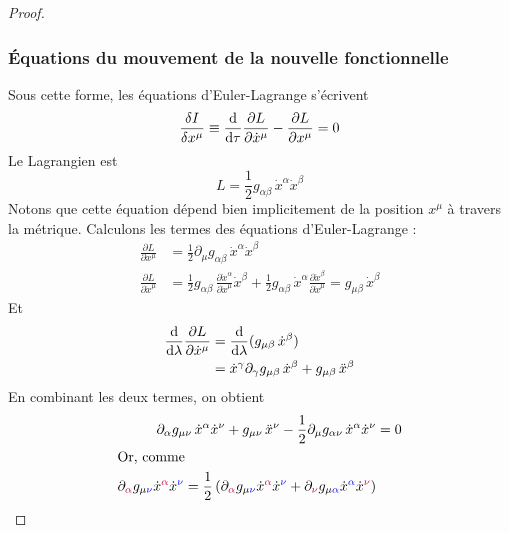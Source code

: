 \begin{proof}
    \subsubsection{Équations du mouvement de la nouvelle fonctionnelle}
    Sous cette forme, les équations d'Euler-Lagrange s'écrivent
    \begin{equation}
        \frac{\delta I}{\delta x^{\mu}} \equiv \frac{\mathrm{d} }{\mathrm{d} \tau}\frac{\partial L}{\partial \dot{x}^{\mu}} - \frac{\partial L}{\partial {x}^{\mu}} = 0
    \end{equation}
    Le Lagrangien est
    \begin{equation}
        L = \frac{1}{2}g_{\alpha \beta}\,\dot{x}^{\alpha}\dot{x}^{\beta} 
    \end{equation}
    Notons que cette équation dépend bien implicitement de la position $x^\mu$ à travers la métrique. Calculons les termes des équations d'Euler-Lagrange :
    \begin{align}
        \frac{\partial L}{\partial x^{\mu}}& =\frac{1}{2}\partial_{\mu}g_{\alpha \beta}\,\dot{x}^{\alpha}\dot{x}^{\beta}\\
        \frac{\partial L}{\partial \dot{x}^{\mu}} &= \frac{1}{2}g_{\alpha \beta}\,\frac{\partial \dot{x}^{\alpha}}{\partial \dot{x}^{\mu}}\dot{x}^{\beta} + \frac{1}{2}g_{\alpha \beta}\,\dot{x}^{\alpha}\frac{\partial \dot{x}^{\beta}}{\partial \dot{x}^{\mu}} = g_{\mu \beta}\, \dot{x}^{\beta}
    \end{align}
    Et
    \begin{align}
        \frac{\mathrm{d}}{\mathrm{d}\lambda}\frac{\partial L}{\partial \dot{x}^{\mu}} &= \frac{\mathrm{d}}{\mathrm{d}\lambda}(g_{\mu \beta}\,\dot{x}^{\beta})\\
        &= \dot{x}^{\gamma} \partial_{\gamma}g_{\mu \beta}\,\dot{x}^{\beta} + g_{\mu \beta}\,\ddot{x}^{\beta}
    \end{align}
    En combinant les deux termes, on obtient
    \begin{align}
        \partial_{\alpha}g_{\mu \nu}\,\dot{x}^{\alpha}\dot{x}^{\nu} + g_{\mu \nu}\,\ddot{x}^{\nu} - \frac{1}{2}\partial_{\mu}g_{\alpha \nu}\,\dot{x}^{\alpha}\dot{x}^{\nu} &= 0 \\
    \intertext{Or, comme}
        \partial_{\textcolor{purple}{\alpha}}g_{\mu \textcolor{blue}{\nu}}\dot{x}^{\textcolor{purple}{\alpha}}\dot{x}^{\textcolor{blue}{\nu}} = \frac{1}{2} \lt\partial_{\textcolor{purple}{\alpha}}g_{\mu \textcolor{blue}{\nu}} \dot{x}^{\textcolor{purple}{\alpha}}\dot{x}^{\textcolor{blue}{\nu}} + \partial_{\textcolor{purple}{\nu}}g_{\mu \textcolor{blue}{\alpha}}\dot{x}^{\textcolor{blue}{\alpha}}\dot{x}^{\textcolor{purple}{\nu}} \rt

\end{align}
\end{proof}
